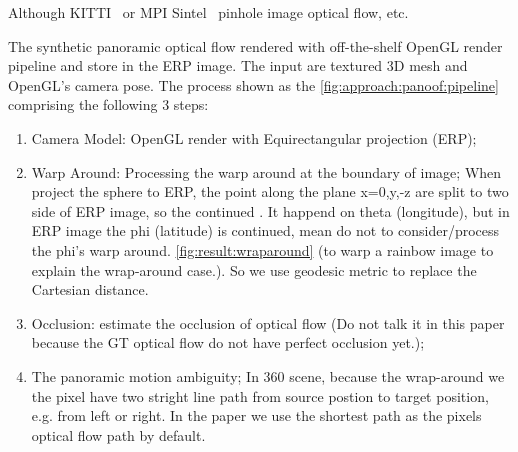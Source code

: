 Although KITTI~\cite{MenzeHG2018} or MPI Sintel~\cite{ButleWSB2012} pinhole image optical flow, etc.

The synthetic panoramic optical flow rendered with off-the-shelf OpenGL render pipeline and store in the ERP image.
The input are textured 3D mesh and OpenGL's camera pose.
The process shown as the \cref{fig:approach:panoof:pipeline} comprising the following 3 steps:

\begin{enumerate}
	\item Camera Model: OpenGL render with Equirectangular projection (ERP);
	\item Warp Around: Processing the warp around at the boundary of image; When project the sphere to ERP, the point along the plane x=0,y,-z are split to two side of ERP image, so the continued . It happend on theta (longitude), but in ERP image the phi (latitude) is continued, mean do not to consider/process the phi's warp around. \cref{fig:result:wraparound} (to warp a rainbow image to explain the wrap-around case.). So we use geodesic metric to replace the Cartesian distance.
	\item Occlusion: estimate the occlusion of optical flow (Do not talk it in this paper because the GT optical flow do not have perfect occlusion yet.);
	\item The panoramic motion ambiguity; In 360 scene, because the wrap-around we the pixel have two stright line path from source postion to target position, e.g. from left or right. In the paper we use the shortest path as the pixels optical flow path by default.
\end{enumerate}




%

